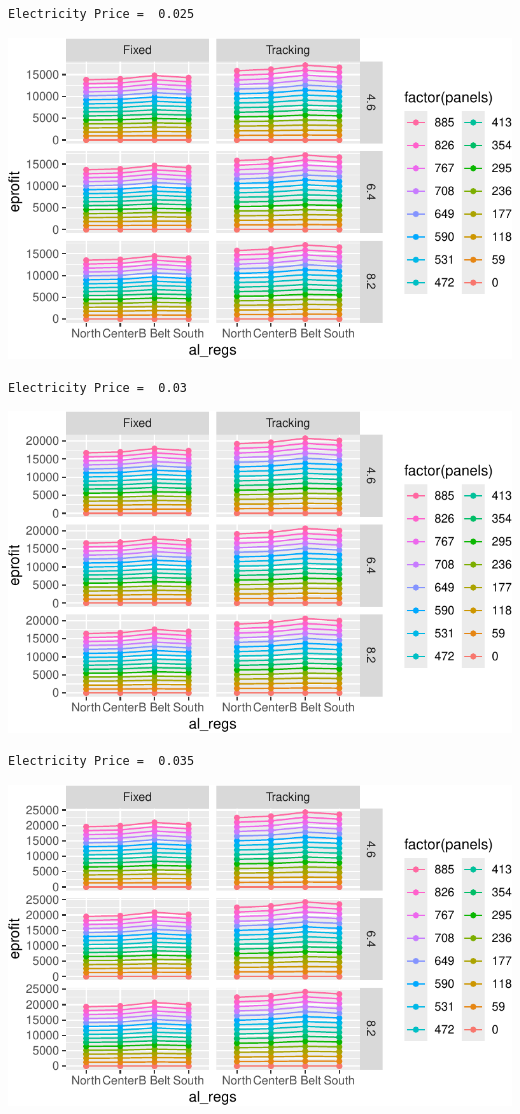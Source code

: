 \documentclass[
  letterpaper,
  DIV=11,
  numbers=noendperiod]{scrartcl}
\begin{document}
\begin{verbatim}
Electricity Price =  0.025
\end{verbatim}

\includegraphics{Simulation_files/figure-pdf/unnamed-chunk-25-4.pdf}

\begin{verbatim}
Electricity Price =  0.03
\end{verbatim}

\includegraphics{Simulation_files/figure-pdf/unnamed-chunk-25-5.pdf}

\begin{verbatim}
Electricity Price =  0.035
\end{verbatim}

\includegraphics{Simulation_files/figure-pdf/unnamed-chunk-25-6.pdf}
\end{document}
